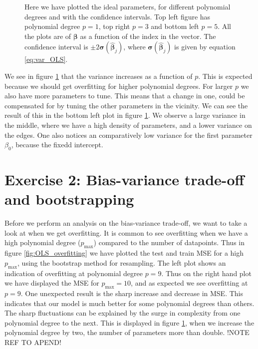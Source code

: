\documentclass[reprint,english,notitlepage,aps,nobalancelastpage,nofootinbib]{revtex4-1}  %
\begin{document}
\begin{figure}[H]
	\endminipage\hfill
	\caption{Here we have plotted the ideal parameters, for different polynomial degrees and with the confidence intervals. Top left figure has polynomial degree $p = 1$, top right $p = 3$ and bottom left $p = 5$. All the plots are of $\boldsymbol{\beta}$ as a function of the index in the vector. The confidence interval is $\pm 2\boldsymbol{\sigma}(\boldsymbol{\hat{\beta}}_{j})$, where $\boldsymbol{\sigma}(\boldsymbol{\hat{\beta}}_{j})$ is given by equation \eqref{eq:var_OLS}.} \label{fig:var_beta}
	\endminipage
\end{figure}
We see in figure \ref{fig:var_beta} that the variance increases as a function of $p$. This is expected because we should get overfitting for higher polynomial degrees. For larger $p$ we also have more parameters to tune. This means that a change in one, could be compensated for by tuning the other parameters in the vicinity. We can see the result of this in the bottom left plot in figure \ref{fig:var_beta}. We observe a large variance in the middle, where we have a high density of parameters, and a lower variance on the edges. One also notices an comparatively low variance for the first parameter $\beta_0$, because the fixedd intercept.


\section*{Exercise 2: Bias-variance trade-off and bootstrapping}

Before we perform an analysis on the bias-variance trade-off, we want to take a look at when we get overfitting. It is common to see overfitting when we have a high polynomial degree ($p_\text{max}$) compared to the number of datapoints. Thus in figure \ref{fig:OLS_overfitting} we have plotted the test and train MSE for a high $p_\text{max}$, using the bootstrap method for resampling. The left plot shows an indication of overfitting at polynomial degree $p = 9$. Thus on the right hand plot we have displayed the MSE for $p_\text{max} = 10$, and as expected we see overfitting at $p=9$. One unexpected result is the sharp increase and decrease in MSE. This indicates that our model is much better for some polynomial degrees than others. The sharp fluctuations can be explained by the surge in complexity from one polynomial degree to the next. This is displayed in figure \ref{fig:var_beta}, when we increase the polynomial degree by two, the number of parameters more than double. !NOTE REF TO APEND!
\end{document}
